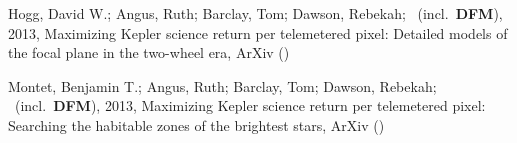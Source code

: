 \item[{\color{numcolor}\scriptsize2}] Hogg, David W.; Angus, Ruth; Barclay, Tom; Dawson, Rebekah; \etal\ (incl.\ \textbf{DFM}), 2013, Maximizing Kepler science return per telemetered pixel: Detailed models of the focal plane in the two-wheel era, ArXiv ()

\item[{\color{numcolor}\scriptsize1}] Montet, Benjamin T.; Angus, Ruth; Barclay, Tom; Dawson, Rebekah; \etal\ (incl.\ \textbf{DFM}), 2013, Maximizing Kepler science return per telemetered pixel: Searching the habitable zones of the brightest stars, ArXiv ()